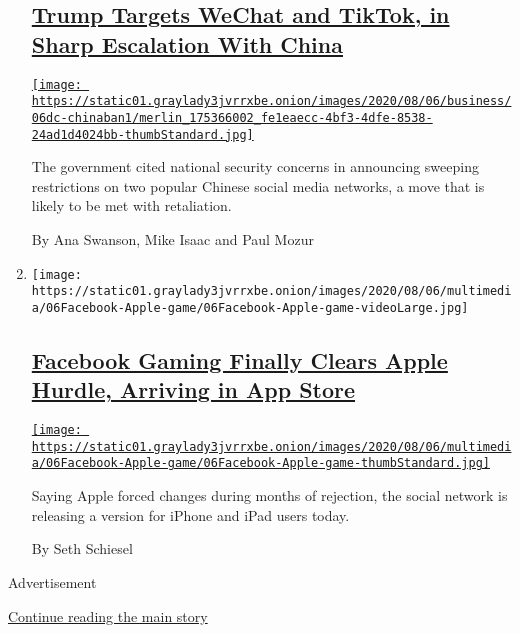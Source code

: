 \begin{enumerate}
  \hypertarget{trump-targets-wechat-and-tiktok-in-sharp-escalation-with-china}{%
  \subsection{\texorpdfstring{\href{/2020/08/06/technology/trump-wechat-tiktok-china.html}{Trump
  Targets WeChat and TikTok, in Sharp Escalation With
  China}}{Trump Targets WeChat and TikTok, in Sharp Escalation With China}}\label{trump-targets-wechat-and-tiktok-in-sharp-escalation-with-china}}

  \href{/2020/08/06/technology/trump-wechat-tiktok-china.html}{\texttt{[image: https://static01.graylady3jvrrxbe.onion/images/2020/08/06/business/06dc-chinaban1/merlin\_175366002\_fe1eaecc-4bf3-4dfe-8538-24ad1d4024bb-thumbStandard.jpg]}}

  The government cited national security concerns in announcing sweeping
  restrictions on two popular Chinese social media networks, a move that
  is likely to be met with retaliation.

  By Ana Swanson, Mike Isaac and Paul Mozur
\item
  \texttt{[image: https://static01.graylady3jvrrxbe.onion/images/2020/08/06/multimedia/06Facebook-Apple-game/06Facebook-Apple-game-videoLarge.jpg]}

  \hypertarget{facebook-gaming-finally-clears-apple-hurdle-arriving-in-app-store}{%
  \subsection{\texorpdfstring{\href{/2020/08/07/technology/facebook-apple-gaming-app-store.html}{Facebook
  Gaming Finally Clears Apple Hurdle, Arriving in App
  Store}}{Facebook Gaming Finally Clears Apple Hurdle, Arriving in App Store}}\label{facebook-gaming-finally-clears-apple-hurdle-arriving-in-app-store}}

  \href{/2020/08/07/technology/facebook-apple-gaming-app-store.html}{\texttt{[image: https://static01.graylady3jvrrxbe.onion/images/2020/08/06/multimedia/06Facebook-Apple-game/06Facebook-Apple-game-thumbStandard.jpg]}}

  Saying Apple forced changes during months of rejection, the social
  network is releasing a version for iPhone and iPad users today.

  By Seth Schiesel
\end{enumerate}

Advertisement

\protect\hyperlink{after-mid1}{Continue reading the main story}

